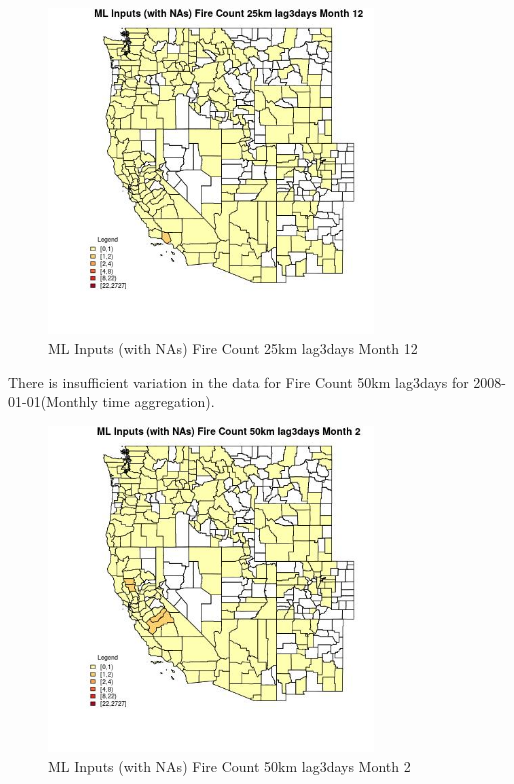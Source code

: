 \begin{figure} 
\centering  
\includegraphics[width=0.77\textwidth]{Code_Outputs/Report_ML_input_PM25_Step4_part_f_de_duplicated_aves_prioritize_24hr_obswNAs_CountyFire_Count_25km_lag3daysmedianMonth12.jpg} 
\caption{\label{fig:Report_ML_input_PM25_Step4_part_f_de_duplicated_aves_prioritize_24hr_obswNAsCountyFire_Count_25km_lag3daysmedianMonth12}ML Inputs (with NAs) Fire Count 25km lag3days Month 12} 
\end{figure} 
 

There is insufficient variation in the data for Fire Count 50km lag3days for 2008-01-01(Monthly time aggregation). 
 

\begin{figure} 
\centering  
\includegraphics[width=0.77\textwidth]{Code_Outputs/Report_ML_input_PM25_Step4_part_f_de_duplicated_aves_prioritize_24hr_obswNAs_CountyFire_Count_50km_lag3daysmedianMonth2.jpg} 
\caption{\label{fig:Report_ML_input_PM25_Step4_part_f_de_duplicated_aves_prioritize_24hr_obswNAsCountyFire_Count_50km_lag3daysmedianMonth2}ML Inputs (with NAs) Fire Count 50km lag3days Month 2} 
\end{figure} 
 

